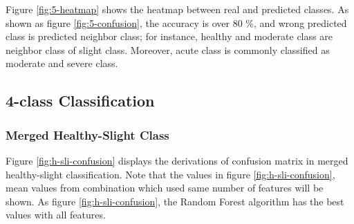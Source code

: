 \documentclass[aps, 11pt, a4paper]{article}
\begin{document}
    		Figure \ref{fig:5-heatmap} shows the heatmap between real and predicted classes. As shown as figure \ref{fig:5-confusion}, the accuracy is over 80 \%, and wrong predicted class is predicted neighbor class; for instance, healthy and moderate class are neighbor class of slight class. Moreover, acute class is commonly classified as moderate and severe class. 
    		
    	\subsection{4-class Classification}
    		\subsubsection{Merged Healthy-Slight Class}
    			Figure \ref{fig:h-sli-confusion} displays the derivations of confusion matrix in merged healthy-slight classification. Note that the values in figure \ref{fig:h-sli-confusion}, mean values from combination which used same number of features will be shown. As figure \ref{fig:h-sli-confusion}, the Random Forest algorithm has the best values with all features. 
    			
\end{document}
